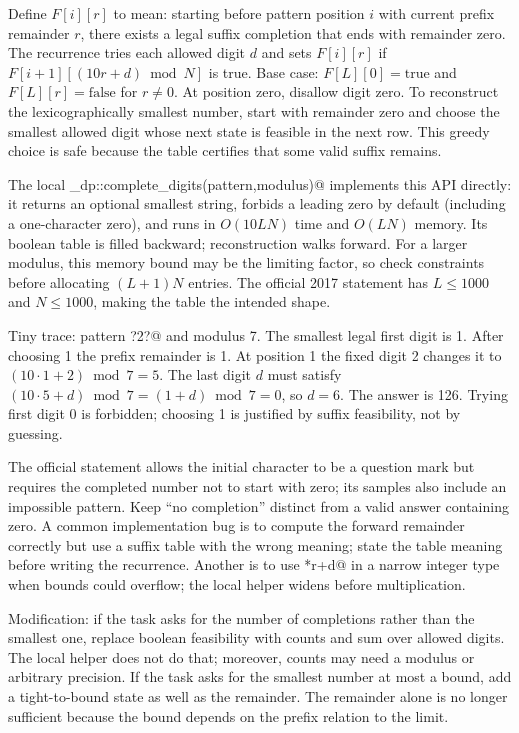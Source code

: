 Define $F[i][r]$ to mean: starting before pattern position $i$ with current
prefix remainder $r$, there exists a legal suffix completion that ends with
remainder zero. The recurrence tries each allowed digit $d$ and sets
$F[i][r]$ if $F[i+1][(10r+d)\bmod N]$ is true. Base case:
$F[L][0]=\text{true}$ and $F[L][r]=\text{false}$ for $r\ne0$. At position
zero, disallow digit zero. To reconstruct the lexicographically smallest
number, start with remainder zero and choose the smallest allowed digit
whose next state is feasible in the next row. This greedy choice is safe
because the table certifies that some valid suffix remains.

The local \verb@finals_dp::complete_digits(pattern,modulus)@ implements this
API directly: it returns an optional smallest string, forbids a leading zero
by default (including a one-character zero), and runs in $O(10LN)$ time and
$O(LN)$ memory. Its boolean table is filled backward; reconstruction walks
forward. For a larger modulus, this memory bound may be the limiting factor,
so check constraints before allocating $(L+1)N$ entries. The official 2017
statement has $L\le1000$ and $N\le1000$, making the table the intended
shape.

Tiny trace: pattern \verb@?2?@ and modulus 7. The smallest legal first digit
is 1. After choosing 1 the prefix remainder is 1. At position 1 the fixed
digit 2 changes it to $(10\cdot1+2)\bmod7=5$. The last digit $d$ must satisfy
$(10\cdot5+d)\bmod7=(1+d)\bmod7=0$, so $d=6$. The answer is 126. Trying
first digit 0 is forbidden; choosing 1 is justified by suffix feasibility,
not by guessing.

The official statement allows the initial character to be a question mark
but requires the completed number not to start with zero; its samples also
include an impossible pattern. Keep ``no completion'' distinct from a valid
answer containing zero. A common implementation bug is to compute the
forward remainder correctly but use a suffix table with the wrong meaning;
state the table meaning before writing the recurrence. Another is to use
*r+d@ in a narrow integer type when bounds could overflow; the local
helper widens before multiplication.

Modification: if the task asks for the number of completions rather than
the smallest one, replace boolean feasibility with counts and sum over
allowed digits. The local helper does not do that; moreover, counts may need
a modulus or arbitrary precision. If the task asks for the smallest number
at most a bound, add a tight-to-bound state as well as the remainder. The
remainder alone is no longer sufficient because the bound depends on the
prefix relation to the limit.

